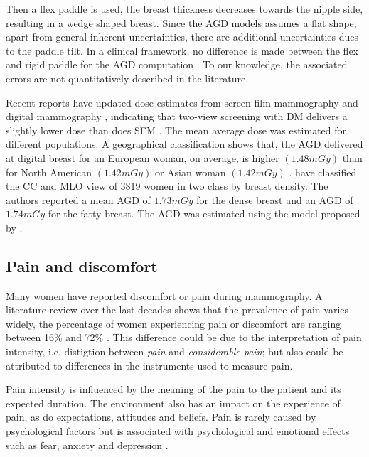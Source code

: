  Then a flex paddle is used, the breast thickness decreases towards the nipple side, resulting in a wedge shaped breast.  Since the AGD models assumes a flat shape, apart from general inherent uncertainties, there are additional uncertainties dues to the paddle tilt. In a clinical framework, no difference is made between the flex and rigid paddle for the AGD computation \citep{broeders_comparison_2015}. To our knowledge, the associated errors are not quantitatively described in the literature.  

Recent reports have updated dose estimates from screen-film mammography and digital mammography , indicating that two-view screening with DM delivers a slightly lower dose than does SFM . The mean average dose was estimated for different populations. A geographical classification shows that, the AGD delivered at digital breast  for an European woman, on average, is higher  $(1.48 mGy)$   than for North American $(1.42 mGy)$ or Asian woman $(1.42 mGy)$ \citep{geeraert_breast_2012}. \cite{osteraas_average_2018} have classified the CC and MLO view of 3819 women in two class by breast density. The authors reported a mean AGD of $1.73 mGy$ for the dense breast and an AGD of $1.74 mGy$ for the fatty breast. The  AGD was estimated using the model proposed by \cite{dance_additional_2000} .  


\subsection{Pain and discomfort}
Many women have reported discomfort or pain during mammography. A literature review over the last decades shows that the  prevalence of pain varies widely, the percentage of women experiencing pain or discomfort are ranging between 16\% and 72\% \citep{keemers_pain_2000, peipins_impact_2006,dullum_rates_2000, whelehan_effect_2013}. This difference could be due to the interpretation of pain intensity, i.e. distigtion between \textit{pain} and \textit{considerable pain};  but also could be attributed to differences in the instruments used to measure pain. 

Pain intensity is influenced by the meaning of the pain to the patient and its expected duration. The environment also has an impact on the experience of pain, as do expectations, attitudes and beliefs. Pain is rarely caused by psychological factors but is associated with psychological and emotional effects such as fear, anxiety and
depression  \citep{williamson_pain_2005}.

